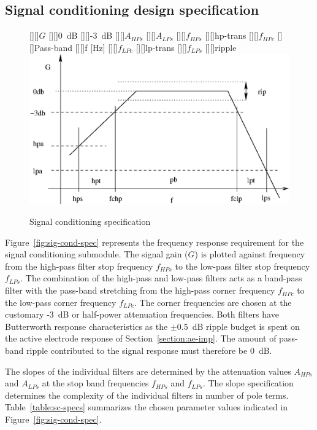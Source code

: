 \subsection{Signal conditioning design specification}
\begin{figure}[htb]
\begin{center}
	[][]{$G$}
 	[]{0~dB} 
 	[]{-3~dB} 
 	[]{$A_{HPs}$} 
 	[]{$A_{LPs}$} 
 	[]{$f_{HPs}$}
 	[]{hp-trans} 
	[][]{$f_{HPc}$} 
	[][]{Pass-band}
	[][]{f [Hz]}
	[][]{$f_{LPc}$}
	[][]{lp-trans}
	[][]{$f_{LPs}$}
	[][]{ripple}
	\includegraphics[width=\textwidth]{sig-cond-spec.eps}
	\caption{Signal conditioning specification}
	\label{fig:sig-cond-spec} 
\end{center}
\end{figure}

Figure~\vref{fig:sig-cond-spec} represents the frequency response
requirement for the signal conditioning submodule. The signal gain
($G$) is plotted against frequency from the high-pass filter stop
frequency $f_{HPs}$ to the low-pass filter stop frequency
$f_{LPs}$. The combination of the high-pass and low-pass filters acts
as a band-pass filter with the pass-band stretching from the high-pass
corner frequency $f_{HPc}$ to the low-pass corner frequency
$f_{LPc}$. The corner frequencies are chosen at the customary -3~dB or
half-power attenuation frequencies. Both filters have Butterworth
response characteristics as the $\pm$0.5~dB ripple budget is spent on
the active electrode response of Section~\ref{section:ae-imp}. The
amount of pass-band ripple contributed to the signal response must
therefore be 0~dB.

The slopes of the individual filters are determined by the attenuation
values $A_{HPs}$ and $A_{LPs}$ at the stop band frequencies $f_{HPs}$
and $f_{LPs}$. The slope specification determines the complexity of
the individual filters in number of pole
terms. Table~\vref{table:sc-specs} summarizes the chosen parameter
values indicated in Figure~\vref{fig:sig-cond-spec}.


